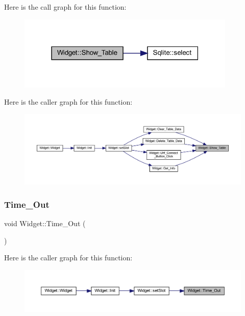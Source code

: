 Here is the call graph for this function\+:
\nopagebreak
\begin{figure}[H]
\begin{center}
\leavevmode
\includegraphics[width=295pt]{class_widget_a426f2aea1215a9b0120eb56e986ce1e9_cgraph}
\end{center}
\end{figure}
Here is the caller graph for this function\+:
\nopagebreak
\begin{figure}[H]
\begin{center}
\leavevmode
\includegraphics[width=350pt]{class_widget_a426f2aea1215a9b0120eb56e986ce1e9_icgraph}
\end{center}
\end{figure}
\mbox{\label{class_widget_ab0e14fcdbe3b8a8541160d01f0eef979}} 
\subsubsection{\texorpdfstring{Time\_Out}{Time\_Out}}
{\footnotesize\ttfamily void Widget\+::\+Time\+\_\+\+Out (\begin{DoxyParamCaption}{ }\end{DoxyParamCaption})\hspace{0.3cm}{\ttfamily [slot]}}

Here is the caller graph for this function\+:
\nopagebreak
\begin{figure}[H]
\begin{center}
\leavevmode
\includegraphics[width=350pt]{class_widget_ab0e14fcdbe3b8a8541160d01f0eef979_icgraph}
\end{center}
\end{figure}
\mbox{\label{class_widget_acceb5443a97ee9023250cda33f183bef}} 
